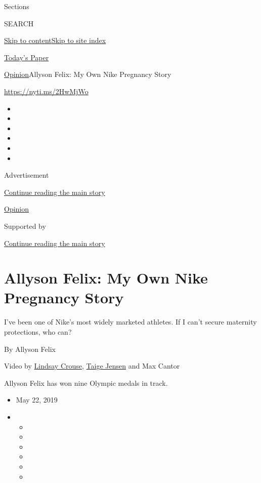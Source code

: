 Sections

SEARCH

\protect\hyperlink{site-content}{Skip to
content}\protect\hyperlink{site-index}{Skip to site index}

\href{https://myaccount.nytimes3xbfgragh.onion/auth/login?response_type=cookie\&client_id=vi}{}

\href{https://www.nytimes3xbfgragh.onion/section/todayspaper}{Today's
Paper}

\href{/section/opinion}{Opinion}\textbar{}Allyson Felix: My Own Nike
Pregnancy Story

\url{https://nyti.ms/2HwMjWo}

\begin{itemize}
\item
\item
\item
\item
\item
\item
\end{itemize}

Advertisement

\protect\hyperlink{after-top}{Continue reading the main story}

\href{/section/opinion}{Opinion}

Supported by

\protect\hyperlink{after-sponsor}{Continue reading the main story}

\hypertarget{allyson-felix-my-own-nike-pregnancy-story}{%
\section{Allyson Felix: My Own Nike Pregnancy
Story}\label{allyson-felix-my-own-nike-pregnancy-story}}

I've been one of Nike's most widely marketed athletes. If I can't secure
maternity protections, who can?

By Allyson Felix

Video by
\href{https://www.nytimes3xbfgragh.onion/by/lindsay-crouse}{Lindsay
Crouse}, \href{https://www.nytimes3xbfgragh.onion/by/taige-jensen}{Taige
Jensen} and Max Cantor

Allyson Felix has won nine Olympic medals in track.

\begin{itemize}
\item
  May 22, 2019
\item
  \begin{itemize}
  \item
  \item
  \item
  \item
  \item
  \item
  \end{itemize}
\end{itemize}

